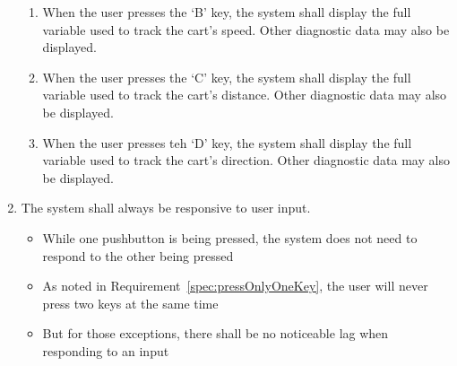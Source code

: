 \begin{enumerate}
\begin{enumerate}
            \item When the user presses the `B' key, the system shall display the full variable used to track the cart's speed.
                Other diagnostic data may also be displayed.
            \item When the user presses the `C' key, the system shall display the full variable used to track the cart's distance.
                Other diagnostic data may also be displayed.
            \item When the user presses teh `D' key, the system shall display the full variable used to track the cart's direction.
                Other diagnostic data may also be displayed.
        \end{enumerate}
    \item \label{spec:responsive} The system shall always be responsive to user input.
        \begin{itemize}
            \item While one pushbutton is being pressed, the system does not need to respond to the other being pressed
            \item As noted in Requirement~\ref{spec:pressOnlyOneKey}, the user will never press two keys at the same time
            \item But for those exceptions, there shall be no noticeable lag when responding to an input
        \end{itemize}
\end{enumerate}